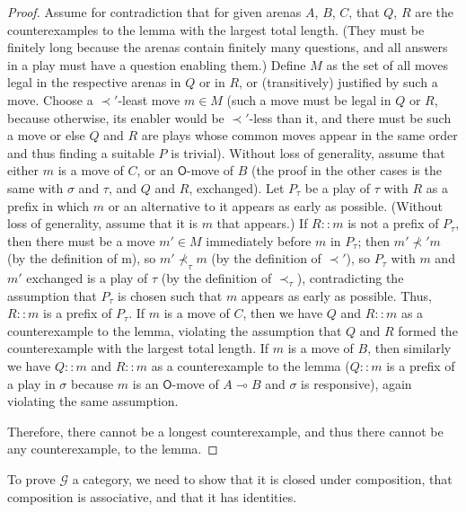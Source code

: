 \documentclass{article}
\begin{document}
\begin{proof}
  Assume for contradiction that for given arenas $A$, $B$, $C$, that $Q$, $R$ are the counterexamples to the lemma with the largest total length. (They must be finitely long because the arenas contain finitely many questions, and all answers in a play must have a question enabling them.) Define $M$ as the set of all moves legal in the respective arenas in $Q$ or in $R$, or (transitively) justified by such a move. Choose a ${\prec'}$-least move $m\in M$ (such a move must be legal in $Q$ or $R$, because otherwise, its enabler would be ${\prec'}$-less than it, and there must be such a move or else $Q$ and $R$ are plays whose common moves appear in the same order and thus finding a suitable $P$ is trivial). Without loss of generality, assume that either $m$ is a move of $C$, or an $\mathsf{O}$-move of $B$ (the proof in the other cases is the same with $\sigma$ and $\tau$, and $Q$ and $R$, exchanged). Let $P_\tau$ be a play of $\tau$ with $R$ as a prefix in which $m$ or an alternative to it appears as early as possible. (Without loss of generality, assume that it is $m$ that appears.) If $R::m$ is not a prefix of $P_\tau$, then there must be a move $m'\in M$ immediately before $m$ in $P_\tau$; then $m'\nprec'm$ (by the definition of m), so $m'\nprec_\tau m$ (by the definition of ${\prec'}$), so $P_\tau$ with $m$ and $m'$ exchanged is a play of $\tau$ (by the definition of ${\prec_\tau}$), contradicting the assumption that $P_\tau$ is chosen such that $m$ appears as early as possible. Thus, $R::m$ is a prefix of $P_\tau$. If $m$ is a move of $C$, then we have $Q$ and $R::m$ as a counterexample to the lemma, violating the assumption that $Q$ and $R$ formed the counterexample with the largest total length. If $m$ is a move of $B$, then similarly we have $Q::m$ and $R::m$ as a counterexample to the lemma ($Q::m$ is a prefix of a play in $\sigma$ because $m$ is an $\mathsf{O}$-move of $A\multimap B$ and $\sigma$ is responsive), again violating the same assumption.

  Therefore, there cannot be a longest counterexample, and thus there cannot be any counterexample, to the lemma.
\end{proof}

To prove $\mathcal G$ a category, we need to show that it is closed under composition, that composition is associative, and that it has identities.
\end{document}

